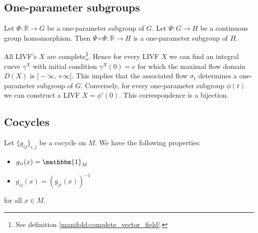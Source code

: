 \subsection{One-parameter subgroups}


        \begin{property}\label{group:OPS_composition}
        	Let $\Phi:\mathbb{R}\rightarrow G$ be a one-parameter subgroup of $G$. Let $\Psi:G\rightarrow H$ be a continuous group homomorphism. Then $\Psi\circ\Phi:\mathbb{R}\rightarrow H$ is a one-parameter subgroup of $H$.
        \end{property}
        
        \begin{property}\label{lie:livf_subgroup}
        	All LIVF's $X$ are complete\footnote{See definition \ref{manifold:complete_vector_field}.}. Hence for every LIVF $X$ we can find an integral curve $\gamma^X$ with initial condition $\gamma^X(0) = e$ for which the maximal flow domain\footnotemark\ $D(X)$ is $]-\infty, +\infty[$. This implies that the associated flow $\sigma_t$ determines a one-parameter subgroup of $G$. Conversely, for every one-parameter subgroup $\phi(t)$ we can construct a LIVF $X = \phi'(0)$. This correspondence is a bijection.
        \end{property}

\subsection{Cocycles}

	\begin{property}
		Let $\{g_{ij}\}_{i,j}$ be a cocycle on $M$. We have the following properties:
		\begin{itemize}
			\item $g_{ii}(x) = \mathbbm{1}_M$
			\item $g_{ij}(x) = (g_{ji}(x))^{-1}$
		\end{itemize}
		for all $x\in M$.
	\end{property}


